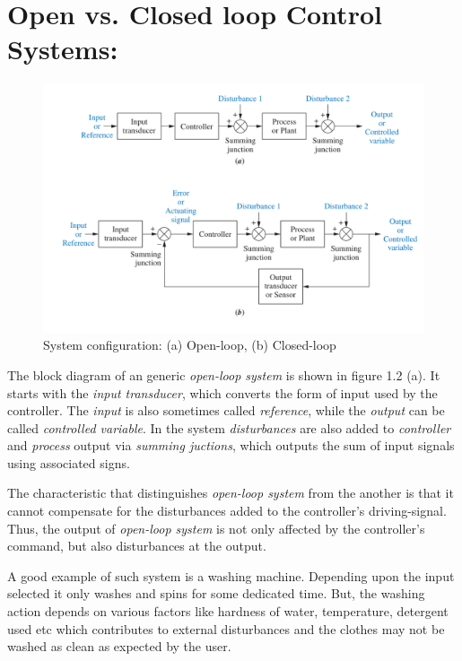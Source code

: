 \documentclass{report}
\begin{document}
\section{Open vs. Closed loop Control Systems:}

\begin{figure}[htbp]
    \centering
    \includegraphics[scale=0.3]{images/Open&Closed_loop_control.png}
    \caption{System configuration: (a) Open-loop, (b) Closed-loop}
\end{figure}
\par
The block diagram of an generic \textit{open-loop system} is shown in figure 1.2 (a). It starts with the \textit{input transducer}, which converts
the form of input used by the controller. The \textit{input} is also sometimes called \textit{reference}, while the \textit{output} can be called
\textit{controlled variable}. In the system \textit{disturbances} are also added to \textit{controller} and \textit{process} output via \textit{summing juctions},
which outputs the sum of input signals using associated signs.
\\
\par
The characteristic that distinguishes \textit{open-loop system} from the another is that it cannot compensate for the disturbances added to the controller's driving-signal.
Thus, the output of \textit{open-loop system} is not only affected by the controller's command, but also disturbances at the output.
\\
\par
A good example of such system is a washing machine. Depending upon the input selected it only washes and spins for some dedicated time. But, the washing action depends on
various factors like hardness of water, temperature, detergent used etc which contributes to external disturbances and the clothes may not be washed as clean as expected by the user.
\end{document}
